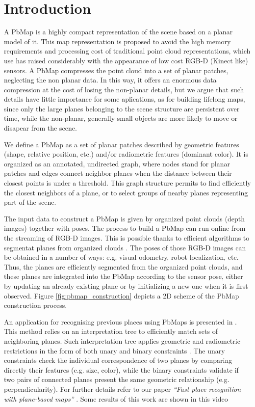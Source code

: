\documentclass[a4paper,11pt]{article}
\begin{document}
\section{Introduction}

A PbMap is a highly compact representation of the scene based on a planar model of it. This map representation is proposed to avoid the high memory requirements and processing cost of traditional point cloud representations, which use has raised considerably with the appearance of low cost RGB-D (Kinect like) sensors. A PbMap compresses the point cloud into a set of planar patches, neglecting the non planar data. In this way, it offers an enormous data compression at the cost of losing the non-planar details, but we argue that such details have little importance for some aplications, as for building lifelong maps, since only the large planes belonging to the scene structure are persistent over time, while the non-planar, generally small objects are more likely to move or disapear from the scene.

We define a PbMap as a set of planar patches described by geometric features (shape, relative position, etc.) and/or radiometric features (dominant color). It is organized as an annotated, undirected graph, where nodes stand for planar patches and edges connect neighbor planes when the distance between their closest points is under a threshold. This graph structure permits to find efficiently the closest neighbors of a plane, or to select groups of nearby planes representing part of the scene.

The input data to construct a PbMap is given by organized point clouds (depth images) together with poses. The process to build a PbMap can run online from the streaming of RGB-D images. This is possible thanks to efficient algorithms to segmentat planes from organized clouds \cite{holz2012fast}. The poses of those RGB-D images can be obtained in a number of ways: e.g. visual odometry, robot localization, etc. Thus, the planes are efficiently segmented from the organized point clouds, and these planes are  integrated into the PbMap according to the sensor pose, either by updating an already existing plane or by initializing a new one when it is first observed. Figure \ref{fig:pbmap_construction} depicts a 2D scheme of the PbMap construction process.

An application for recognising previous places using PbMaps is presented in \cite{fdez2013PbMap}. This method relies on an interpretation tree to efficiently match sets of neighboring planes. Such interpretation tree applies geometric and radiometric restrictions in the form of both unary and binary constraints \cite{grimson1990}. The unary constraints check the individual correspondence of two planes by comparing directly their features (e.g. size, color), while the binary constraints validate if two pairs of connected planes present the same geometric relationship (e.g. perpendicularity). For further details refer to our paper \emph{“Fast place recognition with plane-based maps”} \cite{fdez2013PbMap}. Some results of this work are shown in this video %
\end{document}
